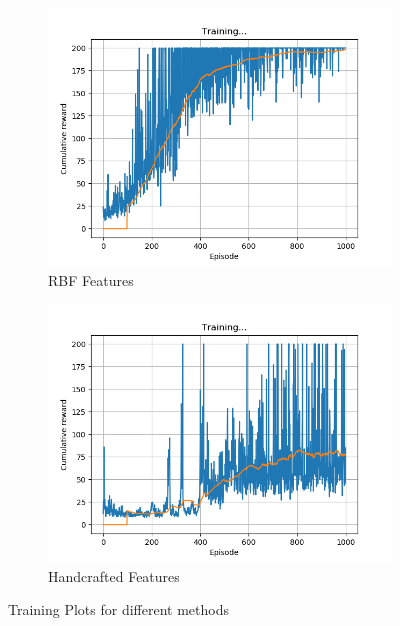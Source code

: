 \documentclass[a4paper]{article}
\begin{document}
\begin{figure}[h!]
    \centering
    \begin{subfigure}[b]{0.49\textwidth}
        \centering
        \includegraphics[width=\textwidth]{training_rbf.png}
        \caption{RBF Features}
        \label{fig-rbf-single}
    \end{subfigure}
    \begin{subfigure}[b]{0.49\textwidth}
        \centering
        \includegraphics[width=\textwidth]{training_handcrafted.png}
        \caption{Handcrafted Features}
        \label{fig-handcrafted-single}
    \end{subfigure}
    \caption{Training Plots for different methods}  
    \label{fig-single-update}
\end{figure}
\end{document}

